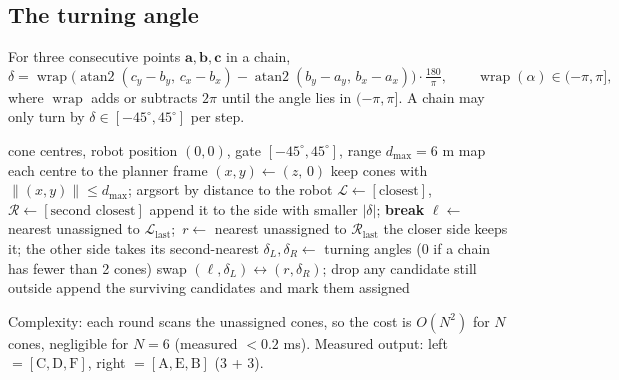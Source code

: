 \documentclass[10pt,a4paper]{scrartcl}
\renewcommand{\emph}[1]{\textcolor{accent}{#1}}
\newcommand{\code}[1]{\texttt{#1}}
\newcommand{\norm}[1]{\left\lVert #1 \right\rVert}
\DeclareMathOperator{\atantwo}{atan2}
\DeclareMathOperator{\wrap}{wrap}
\begin{document}
  \subsection{The turning angle}

  For three consecutive points $\bm a,\bm b,\bm c$ in a chain,
  \begin{equation}
    \delta=\wrap\big(\atantwo(c_y-b_y,\,c_x-b_x)-\atantwo(b_y-a_y,\,b_x-a_x)\big)\cdot\tfrac{180}{\pi},
    \qquad \wrap(\alpha)\in(-\pi,\pi],
  \end{equation}
  where $\wrap$ adds or subtracts $2\pi$ until the angle lies in $(-\pi,\pi]$. A
  chain may only turn by $\delta\in[-45^\circ,45^\circ]$ per step.

  \begin{algorithm}[H]
  \caption{Greedy left/right split as implemented (\code{distinguishLeftRight})}
  \begin{algorithmic}[1]
  \Require cone centres, robot position $(0,0)$, gate $[-45^\circ,45^\circ]$, range $d_{\max}=6$ m
  \State map each centre to the planner frame $(x,y)\gets(z,\,0)$ \Comment{forward coordinate is \emph{not} used}
  \State keep cones with $\norm{(x,y)}\le d_{\max}$; argsort by distance to the robot
  \State $\mathcal L\gets[\text{closest}]$,\ $\mathcal R\gets[\text{second closest}]$
     append it to the side with smaller $|\delta|$; \textbf{break} \EndIf
    \State $\ell\gets$ nearest unassigned to $\mathcal L_{\text{last}}$;\ $r\gets$ nearest unassigned to $\mathcal R_{\text{last}}$
     the closer side keeps it; the other side takes its second-nearest \EndIf
    \State $\delta_L,\delta_R\gets$ turning angles (0 if a chain has fewer than 2 cones)
     swap $(\ell,\delta_L)\leftrightarrow(r,\delta_R)$; drop any candidate still outside \EndIf
    \State append the surviving candidates and mark them assigned
  \EndFor
  \end{algorithmic}
  \end{algorithm}

  Complexity: each round scans the unassigned cones, so the cost is $O(N^2)$ for $N$
  cones, negligible for $N=6$ (measured $<0.2$ ms). \emph{Measured output:} left
  $=[\text{C},\text{D},\text{F}]$, right $=[\text{A},\text{E},\text{B}]$ (3 + 3).
\end{document}
